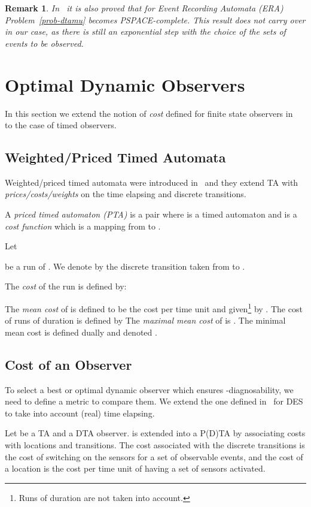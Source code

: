 \documentclass[letterpaper,10pt,conference]{ieeeconf}  \IEEEoverridecommandlockouts                              \overrideIEEEmargins
\newtheorem{remark}{Remark}
\def\endef{\ifmmode\squareforged\else{\unskip\nobreak\hfil
\penalty50\hskip1em\null\nobreak\hfil
\parfillskip=0pt\finalhyphendemerits=0\endgraf}\fi}
\begin{document}
\begin{remark}
  In~\cite{Bouyerfossacs05} it is also proved that for Event Recording
  Automata (ERA)~\cite{AFH94} Problem~\ref{prob-dtamu} becomes
  PSPACE-complete.  This result does not carry over in our case, as
  there is still an exponential step with the choice of the sets of
  events to be observed.
\end{remark}

\section{Optimal Dynamic Observers}\label{sec-cost}
In this section we extend the notion of \emph{cost} defined for finite
state observers in~\cite{cassez-fi-08} to the case of timed observers.

\subsection{Weighted/Priced Timed Automata}
Weighted/priced timed automata were introduced in~\cite{BFH+01,ATP01}
and they extend TA with \emph{prices/costs/weights} on the time
elapsing and discrete transitions.

\begin{definition}
  A \emph{priced timed auto\-ma\-ton (PTA)} is a pair 
  where   is a timed automaton
  and  is a \emph{cost function} which is a mapping from  to . \endef
\end{definition}
Let 

be a run of . We denote by 
the discrete transition taken from  to
.

The \emph{cost} of the run  is defined by:

The \emph{mean cost} of  is defined to be the cost per time
unit and given\footnote{Runs of duration  are not taken into
  account.} by .  The
cost of runs of duration  is defined by
 The \emph{maximal mean cost} of
 is .  The minimal mean cost is defined dually and denoted
.

\subsection{Cost of an Observer}
To select a best or optimal dynamic observer which ensures
-diagnosability, we need to define a metric to compare them.
We extend the one defined in~\cite{cassez-fi-08} for DES to take into
account (real) time elapsing.

Let  be a TA and  a DTA observer.   is extended into a
P(D)TA by associating costs with locations and transitions.  The cost
associated with the discrete transitions is the cost of switching on
the sensors for a set of observable events, and the cost of a location
is the cost per time unit of having a set of sensors activated.
\end{document}
